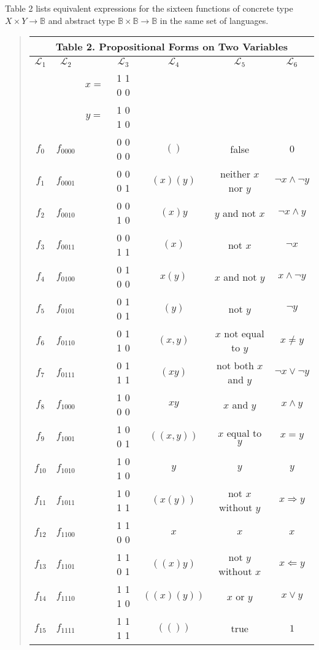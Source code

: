 \documentclass[12pt]{article}
\begin{document}
Table 2 lists equivalent expressions for the sixteen functions of concrete type $X \times Y \to \mathbb{B}$ and abstract type $\mathbb{B} \times \mathbb{B} \to \mathbb{B}$ in the same set of languages.

\begin{quote}\begin{tabular}{|c|c|c|c|c|c|c|}
\multicolumn{7}{c}{\textbf{Table 2.  Propositional Forms on Two Variables}} \\
\hline
$\mathcal{L}_1$ & $\mathcal{L}_2$ &&
$\mathcal{L}_3$ & $\mathcal{L}_4$ &
$\mathcal{L}_5$ & $\mathcal{L}_6$ \\
\hline
& & $x =$ & 1 1 0 0 & & & \\
& & $y =$ & 1 0 1 0 & & & \\
\hline
$f_{0}$  & $f_{0000}$ & & 0 0 0 0 & $( )$    & false                 & $0$ \\
$f_{1}$  & $f_{0001}$ & & 0 0 0 1 & $(x)(y)$ & neither $x$ nor $y$   & $\lnot x \land \lnot y  $ \\
$f_{2}$  & $f_{0010}$ & & 0 0 1 0 & $(x) y$  & $y$ and not $x$       & $\lnot x \land y$ \\
$f_{3}$  & $f_{0011}$ & & 0 0 1 1 & $(x)$    & not $x$               & $\lnot x$ \\
$f_{4}$  & $f_{0100}$ & & 0 1 0 0 & $x (y)$  & $x$ and not $y$       & $x \land \lnot y$ \\
$f_{5}$  & $f_{0101}$ & & 0 1 0 1 & $(y)$    & not $y$               & $\lnot y$ \\
$f_{6}$  & $f_{0110}$ & & 0 1 1 0 & $(x, y)$ & $x$ not equal to $y$  & $x \ne y$ \\
$f_{7}$  & $f_{0111}$ & & 0 1 1 1 & $(x y)$  & not both $x$ and $y$  & $\lnot x \lor \lnot y$ \\
\hline
$f_{8}$  & $f_{1000}$ & & 1 0 0 0 & $x y$      & $x$ and $y$         & $x \land y$ \\
$f_{9}$  & $f_{1001}$ & & 1 0 0 1 & $((x, y))$ & $x$ equal to $y$    & $x = y$ \\
$f_{10}$ & $f_{1010}$ & & 1 0 1 0 & $y$        & $y$                 & $y$ \\
$f_{11}$ & $f_{1011}$ & & 1 0 1 1 & $(x (y))$  & not $x$ without $y$ & $x \Rightarrow y$ \\
$f_{12}$ & $f_{1100}$ & & 1 1 0 0 & $x$        & $x$                 & $x$ \\
$f_{13}$ & $f_{1101}$ & & 1 1 0 1 & $((x) y)$  & not $y$ without $x$ & $x \Leftarrow y$ \\
$f_{14}$ & $f_{1110}$ & & 1 1 1 0 & $((x)(y))$ & $x$ or $y$          & $x \lor y$ \\
$f_{15}$ & $f_{1111}$ & & 1 1 1 1 & $(( ))$    & true                & $1$ \\
\hline
\end{tabular}\end{quote}
\end{document}
